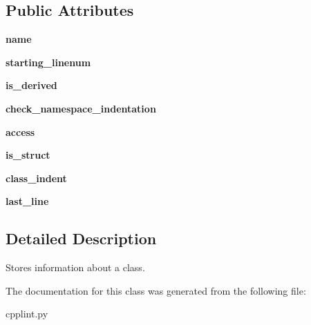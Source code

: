\subsection*{Public Attributes}
\begin{DoxyCompactItemize}
\item 
{\bfseries name}\hypertarget{classcpplint_1_1__ClassInfo_a3de5f207d3449d735d15ebca779fe336}{}\label{classcpplint_1_1__ClassInfo_a3de5f207d3449d735d15ebca779fe336}

\item 
{\bfseries starting\+\_\+linenum}\hypertarget{classcpplint_1_1__ClassInfo_a0c8df96999cd0c160fbb9e3c1ca0ac55}{}\label{classcpplint_1_1__ClassInfo_a0c8df96999cd0c160fbb9e3c1ca0ac55}

\item 
{\bfseries is\+\_\+derived}\hypertarget{classcpplint_1_1__ClassInfo_a8cace481686fbbb35a1da552646aa9f4}{}\label{classcpplint_1_1__ClassInfo_a8cace481686fbbb35a1da552646aa9f4}

\item 
{\bfseries check\+\_\+namespace\+\_\+indentation}\hypertarget{classcpplint_1_1__ClassInfo_a0ead95c17ac0b293d0d371eb7b414bd9}{}\label{classcpplint_1_1__ClassInfo_a0ead95c17ac0b293d0d371eb7b414bd9}

\item 
{\bfseries access}\hypertarget{classcpplint_1_1__ClassInfo_aef1251c699b50c6603ce38ca8cce414c}{}\label{classcpplint_1_1__ClassInfo_aef1251c699b50c6603ce38ca8cce414c}

\item 
{\bfseries is\+\_\+struct}\hypertarget{classcpplint_1_1__ClassInfo_a57b443f42838d73183921d661b6fe4ef}{}\label{classcpplint_1_1__ClassInfo_a57b443f42838d73183921d661b6fe4ef}

\item 
{\bfseries class\+\_\+indent}\hypertarget{classcpplint_1_1__ClassInfo_adc7d328734cc58fe46a3a3f323a09f4a}{}\label{classcpplint_1_1__ClassInfo_adc7d328734cc58fe46a3a3f323a09f4a}

\item 
{\bfseries last\+\_\+line}\hypertarget{classcpplint_1_1__ClassInfo_a72e0f4576cdcb6f3886ed52e2affbc75}{}\label{classcpplint_1_1__ClassInfo_a72e0f4576cdcb6f3886ed52e2affbc75}

\end{DoxyCompactItemize}


\subsection{Detailed Description}
\begin{DoxyVerb}Stores information about a class.\end{DoxyVerb}
 

The documentation for this class was generated from the following file\+:\begin{DoxyCompactItemize}
\item 
cpplint.\+py\end{DoxyCompactItemize}

